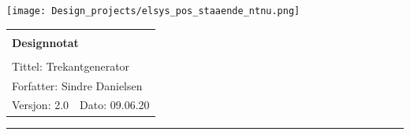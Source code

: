 \documentclass[a4paper,11pt,norsk]{article}
\begin{document}
\begin{minipage}[c]{0.15\textwidth}
\texttt{[image: Design\_projects/elsys\_pos\_staaende\_ntnu.png]} 
\end{minipage}
\begin{minipage}[c]{0.85\textwidth}

\renewcommand{\arraystretch}{1.7}
\large 
\begin{tabularx}{\textwidth}{|X|X|}
\hline
\multicolumn{2}{|l|}{} \\
\multicolumn{2}{|l|}{\huge \textbf{Designnotat}} \\
\multicolumn{2}{|l|}{}  \\
\hline
\multicolumn{2}{|l|}{Tittel: 
Trekantgenerator
} \\
\hline
\multicolumn{2}{|l|}{Forfatter: 
Sindre Danielsen
} \\
\hline
Versjon: 2.0 & Dato: 09.06.20
\\
\hline 
\end{tabularx}
\end{minipage}
\normalsize


\setlength{\parskip}{0ex}
\renewcommand{\baselinestretch}{0.1}\normalsize
\tableofcontents
\renewcommand{\baselinestretch}{1.25}\normalsize
\setlength{\parskip}{2ex}
\rule{\textwidth}{1pt}

\newpage
\end{document}
